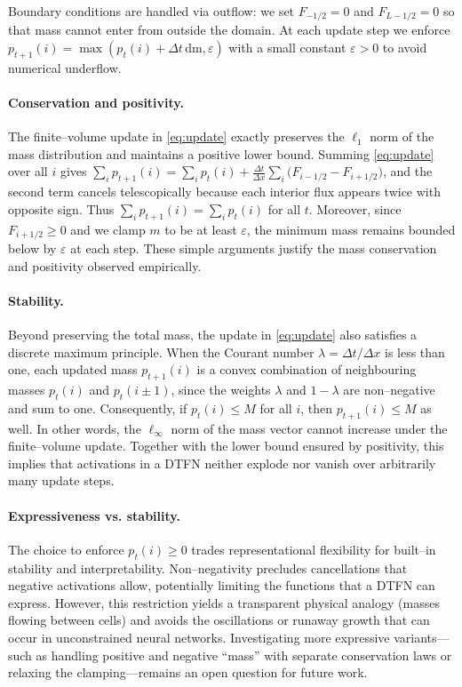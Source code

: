 \documentclass[10pt]{article}
\begin{document}
Boundary conditions are handled via outflow: we set $F_{-1/2}=0$ and
$F_{L-1/2}=0$ so that mass cannot enter from outside the domain.  At
each update step we enforce $p_{t+1}(i)=\max(p_t(i)+\Delta t\,\mathrm{dm},\varepsilon)$ with a
small constant $\varepsilon>0$ to avoid numerical underflow.

\paragraph{Conservation and positivity.}  The finite--volume update in
\eqref{eq:update} exactly preserves the $\ell_1$ norm of the mass
distribution and maintains a positive lower bound.  Summing
\eqref{eq:update} over all $i$ gives
\(\sum_{i} p_{t+1}(i) = \sum_{i} p_t(i) + \frac{\Delta t}{\Delta x}
  \sum_i\bigl(F_{i-1/2} - F_{i+1/2}\bigr)\), and the second term
cancels telescopically because each interior flux appears twice with
opposite sign.  Thus \(\sum_i p_{t+1}(i) = \sum_i p_t(i)\) for all $t$.
Moreover, since $F_{i+1/2}\ge 0$ and we clamp $m$ to be at least
\(\varepsilon\), the minimum mass remains bounded below by
\(\varepsilon\) at each step.  These simple arguments justify the mass
conservation and positivity observed empirically.

\paragraph{Stability.}  Beyond preserving the total mass, the update in
\eqref{eq:update} also satisfies a discrete maximum principle.  When the
Courant number $\lambda = \Delta t/\Delta x$ is less than one, each
updated mass $p_{t+1}(i)$ is a convex combination of neighbouring masses
$p_t(i)$ and $p_t(i\pm1)$, since the weights $\lambda$ and $1-\lambda$ are
non--negative and sum to one.  Consequently, if $p_t(i)\le M$ for all
$i$, then $p_{t+1}(i)\le M$ as well.  In other words, the
$\ell_\infty$ norm of the mass vector cannot increase under the
finite--volume update.  Together with the lower bound ensured by
positivity, this implies that activations in a DTFN neither explode nor
vanish over arbitrarily many update steps.

\paragraph{Expressiveness vs. stability.}  The choice to enforce
$p_t(i)\ge 0$ trades representational flexibility for built--in stability
and interpretability.  Non--negativity precludes cancellations that
negative activations allow, potentially limiting the functions that a
DTFN can express.  However, this restriction yields a transparent
physical analogy (masses flowing between cells) and avoids the
oscillations or runaway growth that can occur in unconstrained neural
networks.  Investigating more expressive variants—such as handling
positive and negative ``mass'' with separate conservation laws or
relaxing the clamping—remains an open question for future work.
\end{document}
